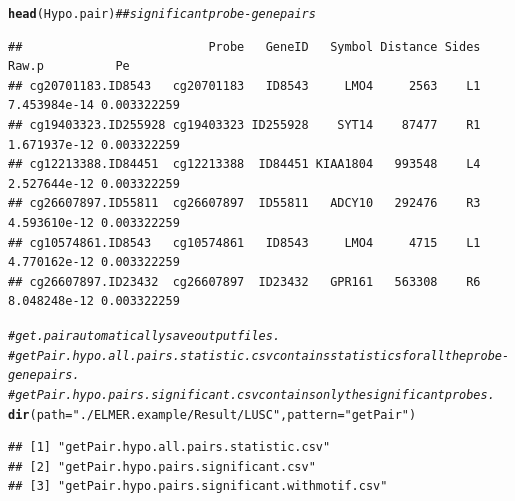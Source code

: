 \documentclass{article}\usepackage[]{graphicx}\usepackage[usenames,dvipsnames]{color}
\makeatletter
\newcommand{\hlstr}[1]{\textcolor[rgb]{0.192,0.494,0.8}{#1}}%
\newcommand{\hlcom}[1]{\textcolor[rgb]{0.678,0.584,0.686}{\textit{#1}}}%
\newcommand{\hlstd}[1]{\textcolor[rgb]{0.345,0.345,0.345}{#1}}%
\newcommand{\hlkwc}[1]{\textcolor[rgb]{0.333,0.667,0.333}{#1}}%
\newcommand{\hlkwd}[1]{\textcolor[rgb]{0.737,0.353,0.396}{\textbf{#1}}}%
\newenvironment{kframe}{%
 \def\at@end@of@kframe{}%
 \ifinner\ifhmode%
  \def\at@end@of@kframe{\end{minipage}}%
  \begin{minipage}{\columnwidth}%
 \fi\fi%
 \def\FrameCommand##1{\hskip\@totalleftmargin \hskip-\fboxsep
 \colorbox{shadecolor}{##1}\hskip-\fboxsep
     \hskip-\linewidth \hskip-\@totalleftmargin \hskip\columnwidth}%
 \MakeFramed {\advance\hsize-\width
   \@totalleftmargin\z@ \linewidth\hsize
   \@setminipage}}%
 {\par\unskip\endMakeFramed%
 \at@end@of@kframe}
\newenvironment{knitrout}{}{} %
\makeatother
\begin{document}
\begin{knitrout}
\begin{kframe}
{\ttfamily\noindent\itshape\color{messagecolor}{\#\# Calculate empirical P value.}}\begin{alltt}
\hlkwd{head}\hlstd{(Hypo.pair)}  \hlcom{## significant probe-gene pairs}
\end{alltt}
\begin{verbatim}
##                          Probe   GeneID   Symbol Distance Sides        Raw.p          Pe
## cg20701183.ID8543   cg20701183   ID8543     LMO4     2563    L1 7.453984e-14 0.003322259
## cg19403323.ID255928 cg19403323 ID255928    SYT14    87477    R1 1.671937e-12 0.003322259
## cg12213388.ID84451  cg12213388  ID84451 KIAA1804   993548    L4 2.527644e-12 0.003322259
## cg26607897.ID55811  cg26607897  ID55811   ADCY10   292476    R3 4.593610e-12 0.003322259
## cg10574861.ID8543   cg10574861   ID8543     LMO4     4715    L1 4.770162e-12 0.003322259
## cg26607897.ID23432  cg26607897  ID23432   GPR161   563308    R6 8.048248e-12 0.003322259
\end{verbatim}
\begin{alltt}
\hlcom{# get.pair automatically save output files. }
\hlcom{#getPair.hypo.all.pairs.statistic.csv contains statistics for all the probe-gene pairs.}
\hlcom{#getPair.hypo.pairs.significant.csv contains only the significant probes.}
\hlkwd{dir}\hlstd{(}\hlkwc{path} \hlstd{=} \hlstr{"./ELMER.example/Result/LUSC"}\hlstd{,} \hlkwc{pattern} \hlstd{=} \hlstr{"getPair"}\hlstd{)}
\end{alltt}
\begin{verbatim}
## [1] "getPair.hypo.all.pairs.statistic.csv"        
## [2] "getPair.hypo.pairs.significant.csv"          
## [3] "getPair.hypo.pairs.significant.withmotif.csv"
\end{verbatim}
\end{kframe}
\end{knitrout}
\end{document}
